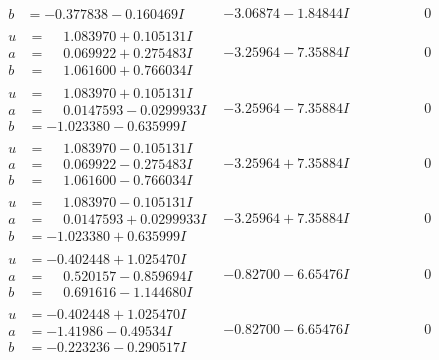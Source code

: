 \documentclass[1p]{elsarticle_modified}
\theoremstyle{definition}
\begin{document}
$$\begin{array}{c|c|c}
\begin{aligned}
b &= -0.377838 - 0.160469 I\end{aligned}
 & -3.06874 - 1.84844 I & \phantom{-0.000000 } 0 \\ \hline\begin{aligned}
u &= \phantom{-}1.083970 + 0.105131 I \\
a &= \phantom{-}0.069922 + 0.275483 I \\
b &= \phantom{-}1.061600 + 0.766034 I\end{aligned}
 & -3.25964 - 7.35884 I & \phantom{-0.000000 } 0 \\ \hline\begin{aligned}
u &= \phantom{-}1.083970 + 0.105131 I \\
a &= \phantom{-}0.0147593 - 0.0299933 I \\
b &= -1.023380 - 0.635999 I\end{aligned}
 & -3.25964 - 7.35884 I & \phantom{-0.000000 } 0 \\ \hline\begin{aligned}
u &= \phantom{-}1.083970 - 0.105131 I \\
a &= \phantom{-}0.069922 - 0.275483 I \\
b &= \phantom{-}1.061600 - 0.766034 I\end{aligned}
 & -3.25964 + 7.35884 I & \phantom{-0.000000 } 0 \\ \hline\begin{aligned}
u &= \phantom{-}1.083970 - 0.105131 I \\
a &= \phantom{-}0.0147593 + 0.0299933 I \\
b &= -1.023380 + 0.635999 I\end{aligned}
 & -3.25964 + 7.35884 I & \phantom{-0.000000 } 0 \\ \hline\begin{aligned}
u &= -0.402448 + 1.025470 I \\
a &= \phantom{-}0.520157 - 0.859694 I \\
b &= \phantom{-}0.691616 - 1.144680 I\end{aligned}
 & -0.82700 - 6.65476 I & \phantom{-0.000000 } 0 \\ \hline\begin{aligned}
u &= -0.402448 + 1.025470 I \\
a &= -1.41986 - 0.49534 I \\
b &= -0.223236 - 0.290517 I\end{aligned}
 & -0.82700 - 6.65476 I & \phantom{-0.000000 } 0 \\ \hline\begin{aligned}

\end{aligned}
\end{array}$$
\end{document}
